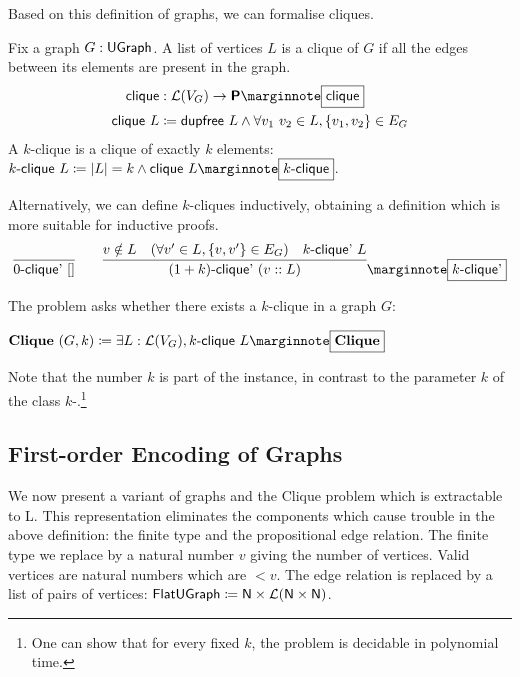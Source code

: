 \newcommand{\clique}{\textsf{clique}}
\newcommand{\kclique}[1]{\text{$#1$-\clique}} 
\newcommand{\kcliqueind}[1]{\text{$#1$-\textsf{clique}'}}
Based on this definition of graphs, we can formalise cliques. 
\begin{definition}
  Fix a graph $G : \textsf{UGraph}$. A list of vertices $L$ is a clique of $G$ if all the edges between its elements are present in the graph.
  \begin{align*}
    \clique{} &: \listsof{V_G} \rightarrow \Prop\mnote{\clique{}} \\
    \clique{}~L &\defeq \dupfree~L \land \forall v_1~v_2 \in L, \{v_1, v_2\} \in E_G 
  \end{align*}
  A $k$-clique is a clique of exactly $k$ elements: 
  $\kclique{k}~L \defeq \length{L} = k \land \clique{}~L\mnote{\kclique{k}}$.
\end{definition}

Alternatively, we can define $k$-cliques inductively, obtaining a definition which is more suitable for inductive proofs. 
\begin{align*}
  \infer{\kcliqueind{0}~\nil}{} \qquad \infer{\kcliqueind{(\natS{k})}~(v :: L)}{v \notin L \quad (\forall v' \in L, \{v, v'\} \in E_G) \quad \kcliqueind{k}~L}\mnote{\kcliqueind{k}}
\end{align*}

The \Clique{} problem asks whether there exists a $k$-clique in a graph $G$: 
\begin{definition}[\Clique{}]
  $\Clique{}~(G, k) \defeq \exists L : \listsof{V_G}, \kclique{k}~L\mnote{\Clique{}}$
\end{definition}
Note that the number $k$ is part of the instance, in contrast to the parameter $k$ of the class $k$-\SAT{}.\footnote{One can show that for every fixed $k$, the \Clique{} problem is decidable in polynomial time.}

\newcommand{\FlatClique}{\textbf{FlatClique}}
\newcommand{\FlatUGraph}{\textsf{FlatUGraph}}
\subsection{First-order Encoding of Graphs}\label{sec:flat_clique}
We now present a variant of graphs and the Clique problem which is extractable to L. This representation eliminates the components which cause trouble in the above definition: the finite type and the propositional edge relation. 
The finite type we replace by a natural number $v$ giving the number of vertices. Valid vertices are natural numbers which are $< v$. The edge relation is replaced by a list of pairs of vertices: $\FlatUGraph \defeq \nat \times \listsof{\nat \times \nat}$.


